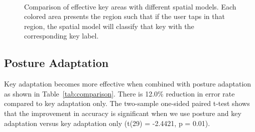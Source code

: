\documentclass{sigchi}
\begin{document}
\begin{figure}[tb]
  \centering
   ~
  \caption{Comparison of effective key areas with different spatial models.  Each colored area presents the region such that if the user taps in that region, the spatial model will classify that key with the corresponding key label.}
  \label{fig:key-boundary}
\end{figure}

\subsection{Posture Adaptation}
Key adaptation becomes more effective when combined with posture adaptation as
shown in Table~\ref{tab:comparison}. There is 12.0\% reduction in error rate 
compared to key adaptation only. The two-sample one-sided paired t-test shows
that the improvement in accuracy is significant when we use posture and key 
adaptation versus key adaptation only (t(29) = -2.4421, p = 0.01).
\end{document}
